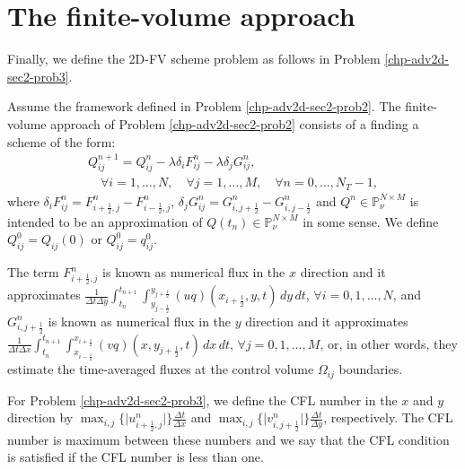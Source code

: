 \section{The finite-volume approach}
\label{sec:fv-2d}
Finally, we define the 2D-FV scheme problem as follows in Problem \ref{chp-adv2d-sec2-prob3}.
\begin{prob}[2D-FV scheme]
	\label{chp-adv2d-sec2-prob3}
	Assume the framework defined in Problem \ref{chp-adv2d-sec2-prob2}.
	The finite-volume approach of Problem \ref{chp-adv2d-sec2-prob2}
	consists of a finding a scheme of the form:
	\begin{align}
		\label{chp-adv2d-2dfv}
		{Q}_{ij}^{n+1} =  {Q}_{ij}^{n} - {\lambda} \delta_i {F}_{ij}^{n} - {\lambda} \delta_j {G}_{ij}^{n},
		\\ \nonumber \quad \forall i = 1, \ldots, N, \quad \forall j = 1, \ldots, M,
		\quad \forall n = 0, \ldots, N_T-1,
	\end{align}
	where $ \delta_i F_{ij}^n =
    {F}_{i+\frac{1}{2},j}^{n} 
    - {F}_{i-\frac{1}{2},j}^{n}$,
    $ \delta_j G_{ij}^n =
    {G}_{i,j+\frac{1}{2}}^{n} 
    - {G}_{i,j-\frac{1}{2}}^{n}$ 
    and ${Q}^{n}\in \mathbb{P}^{N\times M}_{\nu}$ is intended to be an approximation
	of ${Q}(t_{n})\in \mathbb{P}^{N\times M}_{\nu}$ in some sense. We define ${Q}_{ij}^{0} = {Q}_{ij}(0)$ or
	${Q}_{ij}^{0} = {q}^0_{ij}$.
    
    The term ${F}_{i+\frac{1}{2}, j}^{n}$ is known as numerical flux in the 
    $x$ direction and it approximates
	$\frac{1}{\Delta t \Delta y}\int_{t_n}^{t_{n+1}} 
    \int_{y_{j-\frac{1}{2}}}^{y_{j+\frac{1}{2}}} 
    (uq)(x_{i+\frac{1}{2}}, y, t) \,dy \,dt $,
    $\forall i = 0, 1, \ldots, N$, and 
	${G}_{i, j+\frac{1}{2}}^{n}$ is known as numerical flux in the 
    $y$ direction and it approximates
	$\frac{1}{\Delta t \Delta x}\int_{t_n}^{t_{n+1}}  
    \int_{x_{i-\frac{1}{2}}}^{x_{i+\frac{1}{2}}}
    (vq)(x, y_{j+\frac{1}{2}}, t) \,dx \,dt $,
    $\forall j = 0, 1, \ldots, M$,
	or, in other words, they estimate the time-averaged
    fluxes at the control volume $\Omega_{ij}$ boundaries.
\end{prob}
\begin{remark}
For Problem \ref{chp-adv2d-sec2-prob3}, we define the CFL number in the $x$ and $y$ direction
by $\max_{i,j} \{{|u_{i+\frac{1}{2},j}^n}|\}\frac{\Delta t}{\Delta x}$ and 
$\max_{i,j} \{ {|v_{i,j+\frac{1}{2}}^n}|\}\frac{\Delta t}{\Delta y}$, respectively.
The CFL number is maximum between these numbers and we say that the CFL condition is
satisfied if the CFL number is less than one. 
\end{remark}
